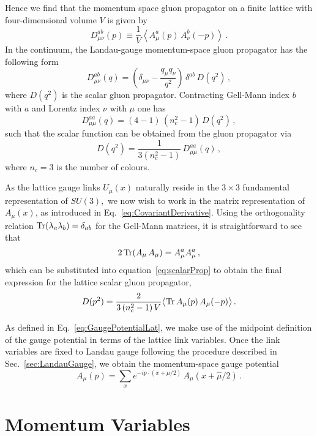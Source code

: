 Hence we find that the momentum space gluon propagator on a finite lattice with four-dimensional volume $V$ is given by
%
\begin{equation}
D_{\mu\nu}^{ab}(p) \equiv \frac{1}{V}\left \langle A^a_\mu (p)\,A^b_\nu(-p)\right\rangle \, . \label{eq:gluonProp}
\end{equation}
%
In the continuum, the Landau-gauge momentum-space gluon propagator has the following form~\cite{Leinweber:1998im,Bonnet:2001uh}
%
\begin{equation}
D^{ab}_{\mu\nu}(q) = \left ( \delta_{\mu\nu} - \frac{q_\mu q_\nu}{q^2} \right )\,\delta^{ab}\,D(q^2) \, ,
\end{equation}
%
where $D(q^2)$ is the scalar gluon propagator.  Contracting Gell-Mann index $b$ with $a$ and
Lorentz index $\nu$ with $\mu$ one has
%
\begin{equation}
D^{aa}_{\mu\mu}(q) = (4-1)\,(n_c^2-1)\,D(q^2) \, ,
\end{equation}
%
such that the scalar function can be obtained from the gluon propagator via
%
\begin{equation}
D(q^2) = \frac{1}{3(n_c^2-1)}\,D^{aa}_{\mu\mu}(q) \, ,
\label{eq:scalarProp}
\end{equation}
%
where $n_c = 3$ is the number of colours.

As the lattice gauge links $U_\mu(x)$ naturally reside in the $3\times 3$ fundamental representation of $SU(3),$ we now wish to work in the matrix representation of $A_\mu(x)$, as introduced in Eq.~\ref{eq:CovariantDerivative}. Using the orthogonality relation $\operatorname{Tr}(\lambda_a\lambda_b) = \delta_{ab}$ for the Gell-Mann matrices, it is straightforward to see that
%
\begin{equation}
2\operatorname{Tr}(A_\mu\,A_\mu) = A^a_\mu A^a_\mu\, ,
\end{equation}
%
which can be substituted into equation~\ref{eq:scalarProp} to obtain the final expression for the lattice scalar gluon propagator,
%
\begin{equation}
D(p^2) = \frac{2}{3\,(n_c^2-1)\,V}\big\langle {\rm Tr}\, A_\mu(p)\,A_\mu(-p) \big\rangle \,. \label{eq:scalarProp2}
\end{equation}

As defined in Eq.~\ref{eq:GaugePotentialLat}, we make use of the midpoint definition of the gauge potential in terms of the lattice link variables. Once the link variables are fixed to Landau gauge following the procedure described in Sec.~\ref{sec:LandauGauge}, we obtain the momentum-space gauge potential
%
\begin{equation}
A_\mu(p) = \sum_x e^{-ip\cdot(x+\hat{\mu}/2)}\, A_\mu(x+\hat{\mu}/2)\, .
\end{equation}


\section{Momentum Variables}

